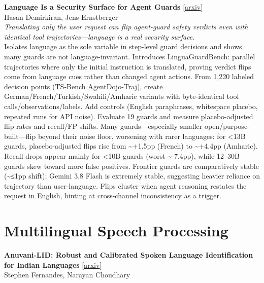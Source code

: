 \documentclass[12pt,letterpaper]{article}
\begin{document}
\medskip

{\small\textbf{Language Is a Security Surface for Agent Guards}} {\scriptsize[\href{https://arxiv.org/abs/2610.22244}{arxiv}]}\\
{\scriptsize Hasan Demirkiran, Jens Ernstberger}\\

{\small\textit{Translating only the user request can flip agent-guard safety verdicts even with identical tool trajectories---language is a real security surface.}}\\[1pt]
{\footnotesize Isolates language as the sole variable in step-level guard decisions and shows many guards are not language-invariant. Introduces LinguaGuardBench: parallel trajectories where only the initial instruction is translated, proving verdict flips come from language cues rather than changed agent actions. From 1,220 labeled decision points (TS-Bench AgentDojo-Traj), create German/French/Turkish/Swahili/Amharic variants with byte-identical tool calls/observations/labels. Add controls (English paraphrases, whitespace placebo, repeated runs for API noise). Evaluate 19 guards and measure placebo-adjusted flip rates and recall/FP shifts. Many guards---especially smaller open/purpose-built---flip beyond their noise floor, worsening with rarer languages: for <13B guards, placebo-adjusted flips rise from \textasciitilde{}+1.5pp (French) to \textasciitilde{}+4.4pp (Amharic). Recall drops appear mainly for <10B guards (worst \textasciitilde{}-7.4pp), while 12--30B guards skew toward more false positives. Frontier guards are comparatively stable (\textasciitilde{}≤1pp shift); Gemini 3.8 Flash is extremely stable, suggesting heavier reliance on trajectory than user-language. Flips cluster when agent reasoning restates the request in English, hinting at cross-channel inconsistency as a trigger.}

\medskip


\section*{Multilingual Speech Processing}

{\small\textbf{Anuvani-LID: Robust and Calibrated Spoken Language Identification for Indian Languages}} {\scriptsize[\href{https://arxiv.org/abs/2610.20263}{arxiv}]}\\
{\scriptsize Stephen Fernandes, Narayan Choudhary}\\
\end{document}
